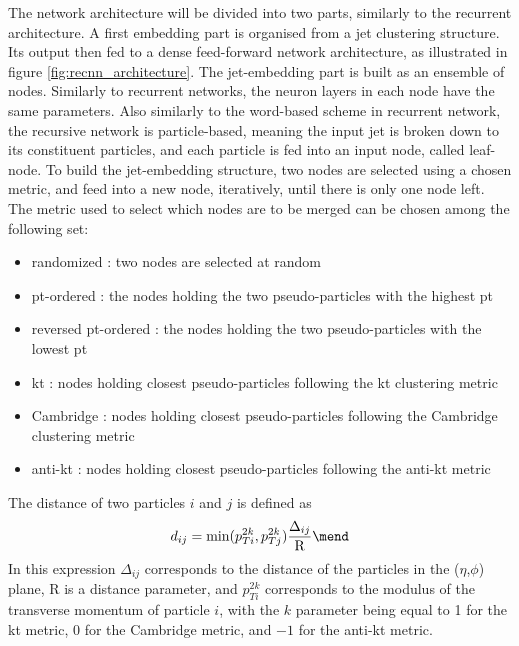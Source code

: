 The network architecture will be divided into two parts, similarly to the recurrent architecture. A first embedding part is organised from a jet clustering structure. Its output then fed to a dense feed-forward network architecture, as illustrated in figure \ref{fig:recnn_architecture}.
The jet-embedding part is built as an ensemble of nodes. Similarly to recurrent networks, the neuron layers in each node have the same parameters. Also similarly to the word-based scheme in recurrent network, the recursive network is particle-based, meaning the input jet is broken down to its constituent particles, and each particle is fed into an input node, called leaf-node. To build the jet-embedding structure, two nodes are selected using a chosen metric, and feed into a new node, iteratively, until there is only one node left. 
The metric used to select which nodes are to be merged can be chosen among the following set:
    
\begin{itemize}
    \item randomized : two nodes are selected at random
    \item pt-ordered : the nodes holding the two pseudo-particles with the highest pt 
    \item reversed pt-ordered : the nodes holding the two pseudo-particles with the lowest pt
    \item kt : nodes holding closest pseudo-particles following the kt clustering metric
    \item Cambridge : nodes holding closest pseudo-particles following the Cambridge clustering metric
    \item anti-kt : nodes holding closest pseudo-particles following the anti-kt metric
\end{itemize}
The distance of two particles $i$ and $j$ is defined as
\begin{equation}
    d_{ij} = \mathrm{min}(p_{Ti}^{2k},p_{Tj}^{2k}) \frac{\Delta_{ij}}{\mathrm{R}} \mend
\end{equation}
In this expression $\Delta_{ij}$ corresponds to the distance of the particles in the ($\eta$,$\phi$) plane, R is a distance parameter, and $p_{Ti}^{2k}$ corresponds to the modulus of the transverse momentum of particle $i$, with the $k$ parameter being equal to 1 for the kt metric, 0 for the Cambridge metric, and $-1$ for the anti-kt metric.

